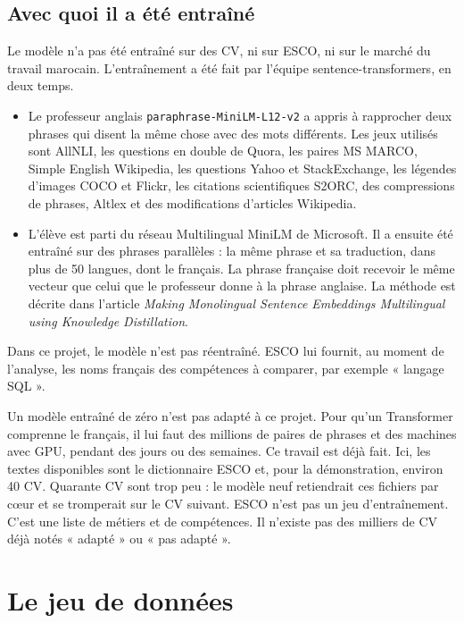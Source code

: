 \documentclass[11pt,a4paper]{article}
\begin{document}
\subsection{Avec quoi il a été entraîné}
Le modèle n'a pas été entraîné sur des CV, ni sur ESCO, ni sur le marché du travail marocain. L'entraînement a été fait par l'équipe sentence-transformers, en deux temps.

\begin{itemize}
  \item Le professeur anglais \texttt{paraphrase-MiniLM-L12-v2} a appris à rapprocher deux phrases qui disent la même chose avec des mots différents. Les jeux utilisés sont AllNLI, les questions en double de Quora, les paires MS MARCO, Simple English Wikipedia, les questions Yahoo et StackExchange, les légendes d'images COCO et Flickr, les citations scientifiques S2ORC, des compressions de phrases, Altlex et des modifications d'articles Wikipedia.
  \item L'élève est parti du réseau Multilingual MiniLM de Microsoft. Il a ensuite été entraîné sur des phrases parallèles : la même phrase et sa traduction, dans plus de 50 langues, dont le français. La phrase française doit recevoir le même vecteur que celui que le professeur donne à la phrase anglaise. La méthode est décrite dans l'article \emph{Making Monolingual Sentence Embeddings Multilingual using Knowledge Distillation}.
\end{itemize}

Dans ce projet, le modèle n'est pas réentraîné. ESCO lui fournit, au moment de l'analyse, les noms français des compétences à comparer, par exemple « langage SQL ».

Un modèle entraîné de zéro n'est pas adapté à ce projet. Pour qu'un Transformer comprenne le français, il lui faut des millions de paires de phrases et des machines avec GPU, pendant des jours ou des semaines. Ce travail est déjà fait. Ici, les textes disponibles sont le dictionnaire ESCO et, pour la démonstration, environ 40 CV. Quarante CV sont trop peu : le modèle neuf retiendrait ces fichiers par cœur et se tromperait sur le CV suivant. ESCO n'est pas un jeu d'entraînement. C'est une liste de métiers et de compétences. Il n'existe pas des milliers de CV déjà notés « adapté » ou « pas adapté ».

\section{Le jeu de données}
\end{document}
